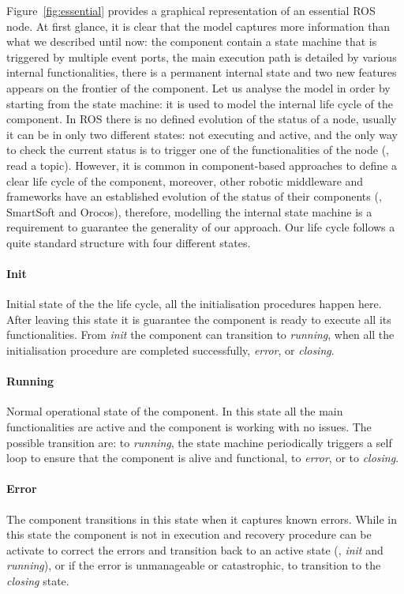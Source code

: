 Figure~\ref{fig:essential} provides a graphical representation of an essential ROS node. At first glance, it is clear that the model captures more information than what we described until now: the component contain a state machine that is triggered by multiple event ports, the main execution path is detailed by various internal functionalities, there is a permanent internal state and two new features appears on the frontier of the component. Let us analyse the model in order by starting from the state machine: it is used to model the internal life cycle of the component. In ROS there is no defined evolution of the status of a node, usually it can be in only two different states: not executing and active, and the only way to check the current status is to trigger one of the functionalities of the node (\eg, read a topic). However, it is common in component-based approaches to define a clear life cycle of the component, moreover, other robotic middleware and frameworks have an established evolution of the status of their components (\eg, SmartSoft and Orocos), therefore, modelling the internal state machine is a requirement to guarantee the generality of our approach. Our life cycle follows a quite standard structure with four different states.

\paragraph{Init} Initial state of the the life cycle, all the initialisation procedures happen here. After leaving this state it is guarantee the component is ready to execute all its functionalities. From \textit{init}  the component can transition to \textit{running}, when all the initialisation procedure are completed successfully, \textit{error}, or \textit{closing}.
\paragraph{Running} Normal operational state of the component. In this state all the main functionalities are active and the component is working with no issues. The possible transition are: to \textit{running}, the state machine periodically triggers a self loop to ensure that the component is alive and functional, to \textit{error},  or to \textit{closing}.
\paragraph{Error} The component transitions in this state when it captures known errors. While in this state the component is not in execution and recovery procedure can be activate to correct the errors and transition back to an active state (\ie, \textit{init} and \textit{running}), or if the error is unmanageable or catastrophic, to transition to the \textit{closing} state.
